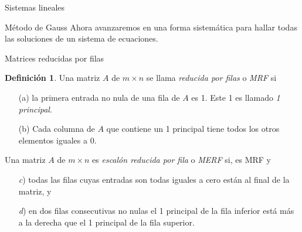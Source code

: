 \documentclass[a4paper,12pt,twoside,spanish]{amsbook}
\theoremstyle{definition}
\newtheorem{definicion}{Definici\'on}[section]
\theoremstyle{remark}
\begin{document}
\begin{chapter}{Sistemas lineales}
	
	
			\begin{section}{Método de Gauss } Ahora avanzaremos en una forma sistemática para hallar todas las soluciones de un sistema de ecuaciones.
	
			
			\begin{subsection}{Matrices reducidas por filas} 
				
				\begin{definicion}
					Una matriz $A$ de $m \times n$ se llama \textit{reducida por filas} o \textit{MRF} si 
					\begin{enumerate}
						\item[(a)] la primera entrada no nula de una fila de $A$ es 1. Este 1 es llamado \textit{1 principal}.
						\item[(b)] Cada columna de $A$ que contiene un  1 principal tiene todos los otros elementos iguales a 0. 
					\end{enumerate} 
				Una matriz $A$ de $m \times n$ es \textit{escalón reducida por fila} o \textit{MERF} si,  es  MRF y
				\begin{enumerate}
					\item[\textit{c})] todas las filas cuyas entradas son todas iguales a cero están al final de la matriz, y
					\item[\textit{d})] en dos filas consecutivas no nulas el 1 principal de la fila inferior está más a la derecha que el 1 principal de la fila superior. 
				\end{enumerate}
				
				\end{definicion} 
				

\end{subsection}
\end{section}
\end{chapter}
\end{document}
